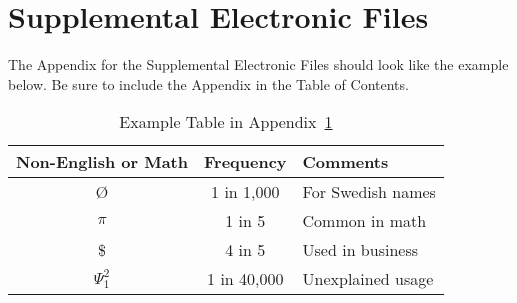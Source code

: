 \chapter{Supplemental Electronic Files}\label{appendix:2}
 The Appendix for the Supplemental Electronic Files should look like the example below. Be sure to include the Appendix in the Table of Contents.
 
 \begin{table}[h]
 	\caption{Example Table in Appendix~\ref{appendix:2}}
 	\label{tab:appendixtable}
 	\centering
 	\begin{tabular}{ccl}
 		\toprule
 		Non-English or Math & Frequency   & Comments          \\
 		\midrule
 		\O                  & 1 in 1,000  & For Swedish names \\
 		$\pi$               & 1 in 5      & Common in math    \\
 		\$                  & 4 in 5      & Used in business  \\
 		$\Psi^2_1$          & 1 in 40,000 & Unexplained usage \\
 		\bottomrule
 	\end{tabular}
 \end{table}